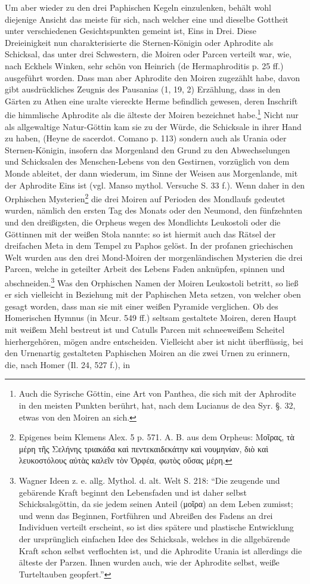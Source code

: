 \documentclass[a4paper, 11pt, oneside, polutonikogreek, german]{article}
\begin{document}
Um aber wieder zu den drei Paphischen Kegeln einzulenken, behält wohl diejenige Ansicht das meiste für sich, nach welcher eine und dieselbe Gottheit unter verschiedenen Gesichtspunkten gemeint ist, Eins in Drei. Diese Dreieinigkeit nun charakterisierte die Sternen-Königin oder Aphrodite als Schicksal, das unter drei Schwestern, die Moiren oder Parcen verteilt war, wie, nach Eckhels Winken, sehr schön von Heinrich (de Hermaphroditis p. 25 ff.) ausgeführt worden. Dass man aber Aphrodite den Moiren zugezählt habe, davon gibt ausdrückliches Zeugnis des Pausanias (1, 19, 2) Erzählung, dass in den Gärten zu Athen eine uralte viereckte Herme befindlich gewesen, deren Inschrift die himmlische Aphrodite als die älteste der Moiren bezeichnet habe.\footnote{Auch die Syrische Göttin, eine Art von Panthea, die sich mit der Aphrodite in den meisten Punkten berührt, hat, nach dem Lucianus de dea Syr. §. 32, etwas von den Moiren an sich.} Nicht nur als allgewaltige Natur-Göttin kam sie zu der Würde, die Schicksale in ihrer Hand zu haben, (Heyne de sacerdot. Comano p. 113) sondern auch als Urania oder Sternen-Königin, insofern das Morgenland den Grund zu den Abwechselungen und Schicksalen des Menschen-Lebens von den Gestirnen, vorzüglich von dem Monde ableitet, der dann wiederum, im Sinne der Weisen aus Morgenlande, mit der Aphrodite Eins ist (vgl. Manso mythol. Versuche S. 33 f.). Wenn daher in den Orphischen Mysterien\footnote{Epigenes beim Klemens Alex. 5 p. 571. A. B. aus dem Orpheus: Μοῖρας, τὰ μέρη τῆς Σελήνης τριακάδα καὶ πεντεκαιδεκάτην καὶ νουμηνίαν, διὸ καὶ λευκοστόλους αὐτὰς καλεῖν τὸν Ὀρφέα, φωτὸς οὔσας μέρη.} die drei Moiren auf Perioden des Mondlaufs gedeutet wurden, nämlich den ersten Tag des Monats oder den Neumond, den fünfzehnten und den dreißigsten, die Orpheus wegen des Mondlichts Leukostoli oder die Göttinnen mit der weißen Stola nannte: so ist hiermit auch das Rätsel der dreifachen Meta in dem Tempel zu Paphos gelöst. In der profanen griechischen Welt wurden aus den drei Mond-Moiren der morgenländischen Mysterien die drei Parcen, welche in geteilter Arbeit des Lebens Faden anknüpfen, spinnen und abschneiden.\footnote{Wagner Ideen z. e. allg. Mythol. d. alt. Welt S. 218: "`Die zeugende und gebärende Kraft beginnt den Lebensfaden und ist daher selbst Schicksalsgöttin, da sie jedem seinen Anteil (μοῖρα) an dem Leben zumisst; und wenn das Beginnen, Fortführen und Abreißen des Fadens an drei Individuen verteilt erscheint, so ist dies spätere und plastische Entwicklung der ursprünglich einfachen Idee des Schicksals, welches in die allgebärende Kraft schon selbst verflochten ist, und die Aphrodite Urania ist allerdings die älteste der Parzen. Ihnen wurden auch, wie der Aphrodite selbst, weiße Turteltauben geopfert."'} Was den Orphischen Namen der Moiren Leukostoli betritt, so ließ er sich vielleicht in Beziehung mit der Paphischen Meta setzen, von welcher oben gesagt worden, dass man sie mit einer weißen Pyramide verglichen. Ob des Homerischen Hymnus (in Mcur. 549 ff.) seltsam gestaltete Moiren, deren Haupt mit weißem Mehl bestreut ist und Catulls Parcen mit schneeweißem Scheitel hierhergehören, mögen andre entscheiden. Vielleicht aber ist nicht überflüssig, bei den Urnenartig gestalteten Paphischen Moiren an die zwei Urnen zu erinnern, die, nach Homer (Il. 24, 527 f.), in 
\end{document}
